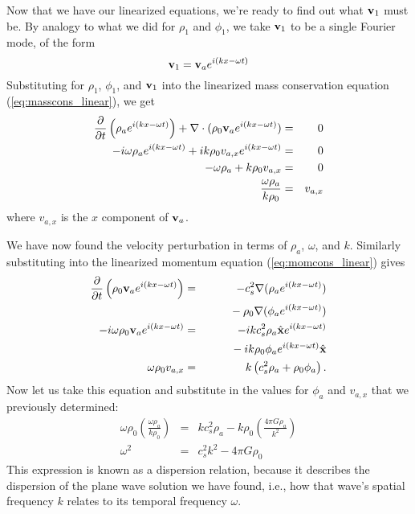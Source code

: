 Now that we have our linearized equations, we're ready to find out what $\mathbf{v}_1$ must be. By analogy to what we did for $\rho_1$ and $\phi_1$, we take $\mathbf{v}_1$ to be a single Fourier mode, of the form
\begin{equation}
\mathbf{v}_1 = \mathbf{v}_a e^{i(kx-\omega t)}
\end{equation}
Substituting for $\rho_1$, $\phi_1$, and $\mathbf{v}_1$ into the linearized mass conservation equation (\ref{eq:masscons_linear}), we get
\begin{eqnarray}
\frac{\partial}{\partial t} \left(\rho_a e^{i(kx-\omega t)}\right) + \nabla\cdot (\rho_0 \mathbf{v}_a e^{i(kx-\omega t)}) & = & 0 \\
-i\omega \rho_a e^{i(kx-\omega t)} + i k \rho_0 v_{a,x} e^{i(kx-\omega t)} & = & 0 \\
-\omega\rho_a + k\rho_0 v_{a,x} & = & 0 \\
\frac{\omega\rho_a}{k\rho_0} & = & v_{a,x}
\end{eqnarray}
where $v_{a,x}$ is the $x$ component of $\mathbf{v}_a$.

We have now found the velocity perturbation in terms of $\rho_a$, $\omega$, and $k$. Similarly substituting into the linearized momentum equation (\ref{eq:momcons_linear}) gives
\begin{eqnarray}
\frac{\partial}{\partial t} \left(\rho_0 \mathbf{v}_a e^{i(kx-\omega t)}\right) & = & -c_s^2 \nabla(\rho_a e^{i(kx-\omega t)})
\nonumber \\
& & \qquad {}
 - \rho_0 \nabla (\phi_a e^{i(kx-\omega t)}) \\
-i\omega \rho_0 \mathbf{v}_a e^{i(kx-\omega t)} & = & -i k c_s^2 \rho_a \hat{\mathbf{x}} e^{i(kx-\omega t)} 
\nonumber \\
& & \qquad {}
- i k \rho_0 \phi_a e^{i(kx-\omega t)} \hat{\mathbf{x}}\\
\omega \rho_0 v_{a,x} & = & k \left(c_s^2 \rho_a + \rho_0 \phi_a\right).
\end{eqnarray}
Now let us take this equation and substitute in the values for $\phi_a$ and $v_{a,x}$ that we previously determined:
\begin{eqnarray}
\omega \rho_0 \left(\frac{\omega\rho_a}{k\rho_0}\right) & = & k c_s^2 \rho_a - k\rho_0 \left(\frac{4\pi G \rho_a}{k^2}\right) \\
\omega^2 & = & c_s^2 k^2 - 4\pi G \rho_0
\end{eqnarray}
This expression is known as a dispersion relation, because it describes the dispersion of the plane wave solution we have found, i.e., how that wave's spatial frequency $k$ relates to its temporal frequency $\omega$. 

